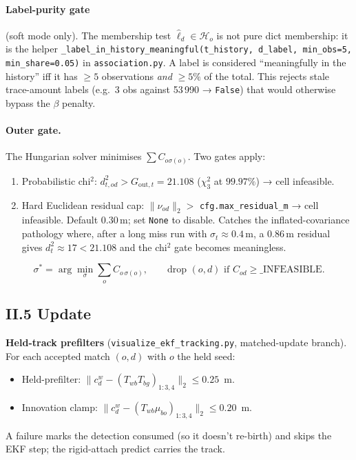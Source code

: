 \documentclass[11pt]{article}
\newcommand{\file}[1]{\texttt{#1}}
\begin{document}
\paragraph{Label-purity gate} (soft mode only).
The membership test $\hat\ell_d \in \mathcal H_o$ is not pure dict
membership: it is the helper
\texttt{\_label\_in\_history\_meaningful(t\_history, d\_label, min\_obs=5,
min\_share=0.05)} in \file{association.py}. A label is considered
``meaningfully in the history'' iff it has $\ge 5$ observations \emph{and}
$\ge 5\%$ of the total. This rejects stale trace-amount labels (e.g.\
3 obs against 53\,990 → \texttt{False}) that would otherwise bypass the
$\beta$ penalty.

\paragraph{Outer gate.}
The Hungarian solver minimises $\sum C_{o\sigma(o)}$. Two gates apply:
\begin{enumerate}[leftmargin=1.5em,itemsep=0pt,topsep=2pt]
\item Probabilistic chi$^2$: $d^2_{t,od} > G_{\text{out},t}=21.108$
  ($\chi^2_3$ at $99.97\%$) → cell infeasible.
\item Hard Euclidean residual cap: $\|\nu_{od}\|_2 > $
  \texttt{cfg.max\_residual\_m} → cell infeasible. Default $0.30$\,m;
  set \texttt{None} to disable. Catches the inflated-covariance
  pathology where, after a long miss run with $\sigma_t \approx 0.4$\,m,
  a $0.86$\,m residual gives $d^2_t \approx 17 < 21.108$ and the chi$^2$
  gate becomes meaningless.
\end{enumerate}
\begin{equation}\label{eq:hung}
\sigma^* = \arg\min_\sigma \sum_{o} C_{o\,\sigma(o)},\qquad
\text{drop } (o,d) \text{ if } C_{od} \ge \_\text{INFEASIBLE}.
\end{equation}

\subsection*{II.5 Update}

\textbf{Held-track prefilters} (\file{visualize\_ekf\_tracking.py},
matched-update branch). For each accepted match $(o,d)$ with $o$ the
held seed:
\begin{itemize}
\item Held-prefilter: $\|c_d^w - (T_{wb}T_{bg})_{1:3,4}\|_2 \le 0.25$~m.
\item Innovation clamp: $\|c_d^w - (T_{wb}\mu_{bo})_{1:3,4}\|_2 \le 0.20$~m.
\end{itemize}
A failure marks the detection consumed (so it doesn't re-birth) and
skips the EKF step; the rigid-attach predict carries the track.
\end{document}

